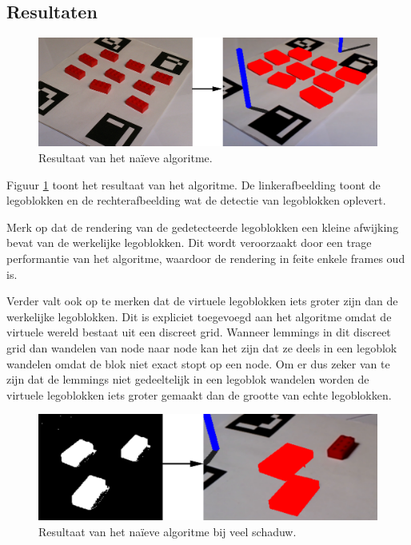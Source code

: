 \subsection{Resultaten}

\begin{figure}
  \centering
  \includegraphics[width=\linewidth]{img/alg1}
  \caption{Resultaat van het na\"ieve algoritme.}
  \label{fig:result_algo1}
\end{figure}


Figuur \ref{fig:result_algo1} toont het resultaat van het algoritme. De linkerafbeelding toont de legoblokken en de rechterafbeelding wat de detectie van legoblokken oplevert. 

Merk op dat de rendering van de gedetecteerde legoblokken een kleine afwijking bevat van de werkelijke legoblokken. Dit wordt veroorzaakt door een trage performantie van het algoritme, waardoor de rendering in feite enkele frames oud is.

Verder valt ook op te merken dat de virtuele legoblokken iets groter zijn dan de werkelijke legoblokken. Dit is expliciet toegevoegd aan het algoritme omdat de virtuele wereld bestaat uit een discreet grid. Wanneer lemmings in dit discreet grid dan wandelen van node naar node kan het zijn dat ze deels in een legoblok wandelen omdat de blok niet exact stopt op een node. Om er dus zeker van te zijn dat de lemmings niet gedeeltelijk in een legoblok wandelen worden de virtuele legoblokken iets groter gemaakt dan de grootte van echte legoblokken.

\begin{figure}
  \centering
  \includegraphics[width=\linewidth]{img/alg1Shadow}
  \caption{Resultaat van het na\"ieve algoritme bij veel schaduw.}
  \label{fig:algo1_shadow}
\end{figure}

